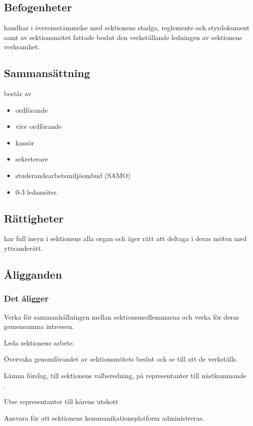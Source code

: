 \section{\STYRITFULL}
 
\subsection{Befogenheter}
\STYRIT{} handhar i överensstämmelse med sektionens stadga, reglemente och
styrdokument samt av sektionsmötet fattade beslut den verkställande
ledningen av sektionens verksamhet.
 
\subsection{Sammansättning}
\STYRIT{} består av
\begin{itemize}
	\item ordförande
	\item vice ordförande
	\item kassör
	\item sekreterare
	\item studerandearbetsmiljöombud (SAMO) 
	\item 0-3 ledamöter.
\end{itemize} 
 
\subsection{Rättigheter}
\STYRIT{} har full insyn i sektionens alla organ och äger rätt att deltaga i deras
möten med yttranderätt.
  
\subsection{Åligganden}

\subsubsection{Det åligger \STYRIT}

\begin{att}
	\item Verka för sammanhållningen mellan sektionsmedlemmarna och verka för deras gemensamma intressen.
	\item Leda sektionens arbete.
	\item Övervaka genomförandet av sektionsmötets beslut och se till att de verkställs.
	\item Lämna förslag, till sektionens valberedning, på representanter till nästkommande \STYRIT.
	\item Utse representanter till kårens utskott
	\item Ansvara för att sektionens kommunikationsplatform administreras.
\end{att}

